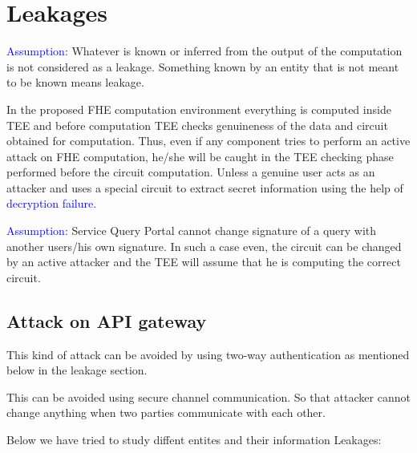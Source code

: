 
\chapter{Leakages}
\setcounter{section}{0}


\textcolor{blue} {Assumption:} Whatever is known or inferred from the output of the computation is not considered as a leakage. Something known by an entity that is not meant to be known means leakage.

In the proposed FHE computation environment everything is computed inside TEE and before computation TEE checks genuineness of the data and circuit obtained for computation. Thus, even if any component tries to perform an active attack on FHE computation, he/she will be caught in the TEE checking phase performed before the circuit computation.  Unless a genuine user acts as an attacker and uses a special circuit to extract secret information using the help of \textcolor{blue} {decryption failure.}

\textcolor{blue} {Assumption:} Service Query Portal cannot change signature of a query with another users/his own signature. In such a case even, the circuit can be changed by an active attacker and the TEE will assume that he is computing the correct circuit.


\section{Attack on API gateway}
This kind of attack can be avoided by using two-way authentication as mentioned below in the leakage section.

This can be avoided using secure channel communication. So that attacker cannot change anything when two parties communicate with each other.


Below we have tried to study diffent entites and their information Leakages:

